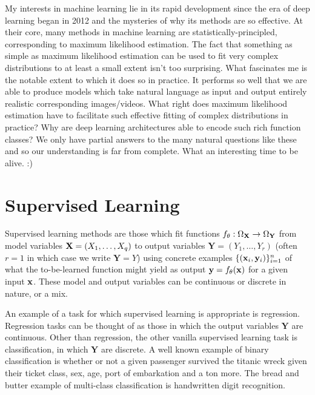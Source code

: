 \documentclass[11pt]{article}
\begin{document}
My interests in machine learning lie in its rapid development since the era of deep learning began in 2012 and the mysteries of why its methods are so effective. At their core, many methods in machine learning are statistically-principled, corresponding to maximum likelihood estimation. The fact that something as simple as maximum likelihood estimation can be used to fit very complex distributions to at least a small extent isn't too surprising. What fascinates me is the notable extent to which it does so in practice. It performs so well that we are able to produce models which take natural language as input and output entirely realistic corresponding images/videos. What right does maximum likelihood estimation have to facilitate such effective fitting of complex distributions in practice? Why are deep learning architectures able to encode such rich function classes? We only have partial answers to the many natural questions like these and so our understanding is far from complete. What an interesting time to be alive. :)

\section{Supervised Learning}
Supervised learning methods are those which fit functions $f_{\theta}:\Omega_{\mathbf{X}}\to\Omega_{\mathbf{Y}}$ from model variables $\mathbf{X}=(X_1,\dots,X_q)$ to output variables $\mathbf{Y}=(Y_1,\dots,Y_r)$ (often $r=1$ in which case we write $\mathbf{Y}=Y$) using concrete examples $\{(\mathbf{x}_i,\mathbf{y}_i)\}_{i=1}^n$ of what the to-be-learned function might yield as output $\mathbf{y}=f_{\theta}(\mathbf{x})$ for a given input $\mathbf{x}$. These model and output variables can be continuous or discrete in nature, or a mix.

An example of a task for which supervised learning is appropriate is regression. Regression tasks can be thought of as those in which the output variables $\mathbf{Y}$ are continuous. Other than regression, the other vanilla supervised learning task is classification, in which $\mathbf{Y}$ are discrete. A well known example of binary classification is whether or not a given passenger survived the titanic wreck given their ticket class, sex, age, port of embarkation and a ton more. The bread and butter example of multi-class classification is handwritten digit recognition.
\end{document}
